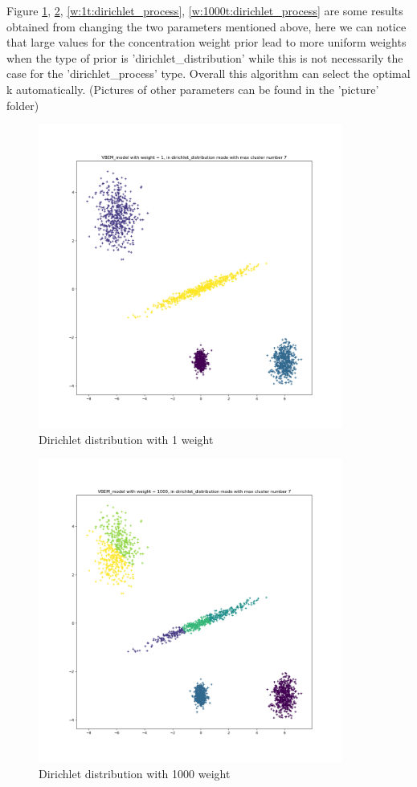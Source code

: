 \documentclass{article}
\theoremstyle{definition}
\numberwithin{equation}{section}
\numberwithin{figure}{section}
\begin{document}
Figure \ref{w:1t:dirichlet_distribution},  \ref{w:1000t:dirichlet_distribution}, \ref{w:1t:dirichlet_process}, \ref{w:1000t:dirichlet_process} are some results obtained from changing the two parameters mentioned above, here we can notice that large values for the concentration weight prior lead to more uniform weights when the type of prior is 'dirichlet\_distribution' while this is not necessarily the case for the 'dirichlet\_process' type. Overall this algorithm can select the optimal k automatically. (Pictures of other parameters can be found in the 'picture' folder)
\begin{figure}[htbp]
	\centering
	\includegraphics[width=10cm]{problem3/VBEM/w:1t:dirichlet_distribution.png}
\caption{Dirichlet distribution with 1 weight}
\label{w:1t:dirichlet_distribution}
\end{figure}

\begin{figure}[htbp]
	\centering
	\includegraphics[width=10cm]{problem3/VBEM/w:1000t:dirichlet_distribution.png}
\caption{Dirichlet distribution with 1000 weight}
\label{w:1000t:dirichlet_distribution}
\end{figure}
\end{document}
